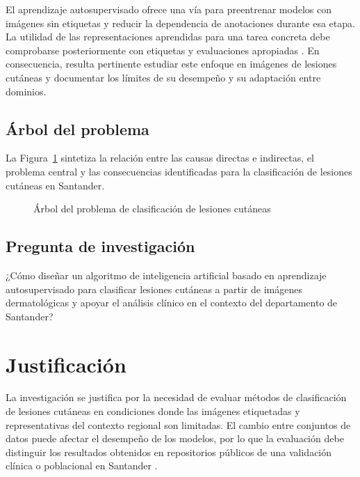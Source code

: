 El aprendizaje autosupervisado ofrece una vía para preentrenar modelos con imágenes sin etiquetas y reducir la dependencia de anotaciones durante esa etapa. La utilidad de las representaciones aprendidas para una tarea concreta debe comprobarse posteriormente con etiquetas y evaluaciones apropiadas \parencite{krishnan2022selfsupervisedmedicine}. En consecuencia, resulta pertinente estudiar este enfoque en imágenes de lesiones cutáneas y documentar los límites de su desempeño y su adaptación entre dominios.

\subsection*{Árbol del problema}

La Figura~\ref{fig:arbol-problema} sintetiza la relación entre las causas directas e indirectas, el problema central y las consecuencias identificadas para la clasificación de lesiones cutáneas en Santander.
\begin{figure}[!htbp]
\caption{Árbol del problema de clasificación de lesiones cutáneas}
\label{fig:arbol-problema}
\centering


\par\smallskip
\raggedright\footnotesize
\par{}
\end{figure}



\subsection{Pregunta de investigación}

¿Cómo diseñar un algoritmo de inteligencia artificial basado en aprendizaje autosupervisado para clasificar lesiones cutáneas a partir de imágenes dermatológicas y apoyar el análisis clínico en el contexto del departamento de Santander?

\section{Justificación}

La investigación se justifica por la necesidad de evaluar métodos de clasificación de lesiones cutáneas en condiciones donde las imágenes etiquetadas y representativas del contexto regional son limitadas. El cambio entre conjuntos de datos puede afectar el desempeño de los modelos, por lo que la evaluación debe distinguir los resultados obtenidos en repositorios públicos de una validación clínica o poblacional en Santander \parencite{yang2024crosshospital}.

